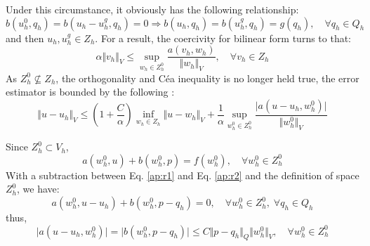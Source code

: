 Under this circumstance, it obviously has the following relationship:
\begin{equation}
b(u^0_h,q_h) = b(u_h-u^g_h,q_h) = 0 \Rightarrow
b(u_h,q_h) = b(u^g_h,q_h) = g(q_h), \quad \forall q_h \in Q_h
\end{equation}
and then $u_h, u^g_h \in Z_h$. For a result, the coercivity for bilinear form turns to that:
\begin{equation}
\alpha \Vert v_h \Vert_V \le \sup_{w_h \in Z^0_h} \frac{a(v_h,w_h)}{\Vert w_h \Vert_V}, \quad \forall v_h \in Z_h
\end{equation}
As $Z^0_h \nsubseteq Z_h$, the orthogonality and Céa inequality is no longer held true, the error estimator is bounded by the following \cite{brenner2008}:
\begin{equation}\label{ap:r4}
\Vert u-u_h \Vert_V \le (1+\frac{C}{\alpha}) \inf_{w_h \in Z_h}\Vert u-w_h \Vert_V + \frac{1}{\alpha}\sup_{w^0_h \in Z^0_h} \frac{\vert a(u-u_h,w^0_h) \vert}{\Vert w^0_h \Vert_V}
\end{equation}

Since $Z^0_h \subset V_h$, 
\begin{equation} \label{ap:r1}
    a(w^0_h,u) + b(w^0_h,p) = f(w^0_h),\quad \forall w^0_h \in Z^0_h 
\end{equation}
With a subtraction between Eq. \eqref{ap:r1} and Eq. \eqref{ap:r2} and the definition of space $Z^0_h$, we have:
\begin{equation}
    a(w^0_h,u-u_h) + b(w^0_h,p-q_h) = 0,\quad \forall w^0_h \in Z^0_h,\; \forall q_h \in Q_h
\end{equation}
thus,
\begin{equation}\label{ap:r5}
\vert a(u-u_h,w^0_h)\vert = \vert b(w^0_h,p-q_h)\vert \le C \Vert p-q_h \Vert_Q \Vert w^0_h \Vert_V,\quad \forall w^0_h \in Z^0_h
\end{equation}

